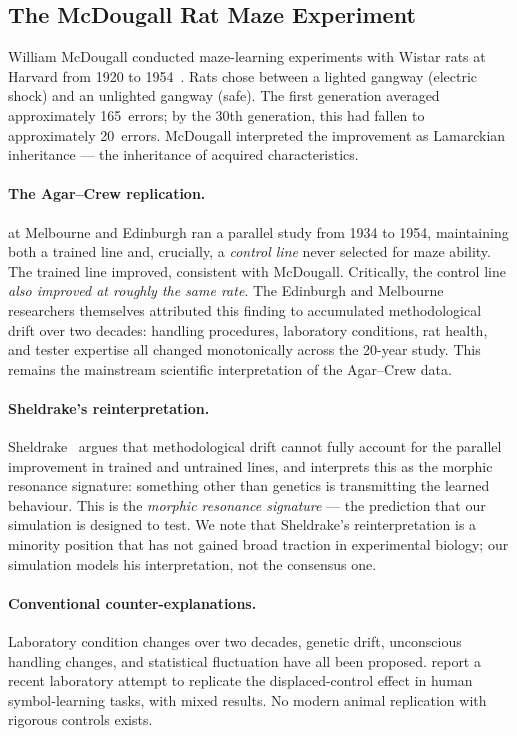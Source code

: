 \documentclass[twoside,11pt]{article}
\begin{document}
\subsection{The McDougall Rat Maze Experiment}
\label{sec:background:mcdougall}

William McDougall conducted maze-learning experiments with Wistar rats at
Harvard from 1920 to 1954~\citep{mcdougall1938}.  Rats chose between a lighted
gangway (electric shock) and an unlighted gangway (safe).  The first generation
averaged approximately 165~errors; by the 30th generation, this had fallen to
approximately 20~errors.  McDougall interpreted the improvement as Lamarckian
inheritance --- the inheritance of acquired characteristics.

\paragraph{The Agar--Crew replication.}
\citet{agar1954} at Melbourne and Edinburgh ran a parallel study from 1934 to
1954, maintaining both a trained line and, crucially, a \emph{control line}
never selected for maze ability.  The trained line improved, consistent with
McDougall.  Critically, the control line \emph{also improved at roughly the
same rate}.  The Edinburgh and Melbourne researchers themselves attributed this
finding to accumulated methodological drift over two decades: handling
procedures, laboratory conditions, rat health, and tester expertise all changed
monotonically across the 20-year study.  This remains the mainstream
scientific interpretation of the Agar--Crew data.

\paragraph{Sheldrake's reinterpretation.}
Sheldrake~\citeyearpar{sheldrake1988} argues that methodological drift cannot
fully account for the parallel improvement in trained and untrained lines, and
interprets this as the morphic resonance signature: something other than
genetics is transmitting the learned behaviour.  This is the \emph{morphic
resonance signature} --- the prediction that our simulation is designed to
test.  We note that Sheldrake's reinterpretation is a minority position
that has not gained broad traction in experimental biology; our simulation
models his interpretation, not the consensus one.

\paragraph{Conventional counter-explanations.}
Laboratory condition changes over two decades, genetic drift, unconscious
handling changes, and statistical fluctuation have all been proposed.
\citet{hitchman2023} report a recent laboratory attempt to replicate the
displaced-control effect in human symbol-learning tasks, with mixed results.
No modern animal replication with rigorous controls exists.
\end{document}
